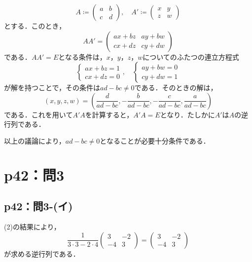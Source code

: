 \begin{tanswer}
  \[
    A \coloneqq \begin{pmatrix} a & b \\ c & d \end{pmatrix},\quad A' \coloneqq \begin{pmatrix} x & y \\ z & w \end{pmatrix}
  \]
  とする．このとき，
  \[
    A A' = \begin{pmatrix} a x + b z & ay + bw \\ cx + dz & cy +dw \end{pmatrix}
  \]
  である．$AA'=E$となる条件は，$x$，$y$，$z$，$w$についてのふたつの連立方程式
  \[
    \begin{cases}
      ax+bz =1 \\
      cx+dz =0
    \end{cases}
    ,\quad
    \begin{cases}
      ay+bw=0 \\
      cy+dw=1
    \end{cases}
  \]
  が解を持つことで，その条件は$ad-bc \ne 0$である．そのときの解は，
  \[
    (x,y,z,w)=  (\frac{d}{ad-bc},-\frac{b}{ad-bc},-\frac{c}{ad-bc},\frac{a}{ad-bc})
  \]
  である．これを用いて$A'A$を計算すると，$A' A =E$となり．たしかに$A'$は$A$の逆行列である．

  以上の議論により，$ad - bc \ne 0$となることが必要十分条件である．
\end{tanswer}

\section*{p42：問3}

\subsection*{p42：問3-(イ)}

\begin{tanswer}
  (2)の結果により，
  \[
    \frac{1}{3 \cdot 3 - 2 \cdot 4} \begin{pmatrix} 3 & -2 \\ -4 & 3 \end{pmatrix} =  \begin{pmatrix} 3 & -2 \\ -4 & 3 \end{pmatrix}
  \]
  が求める逆行列である．
\end{tanswer}

